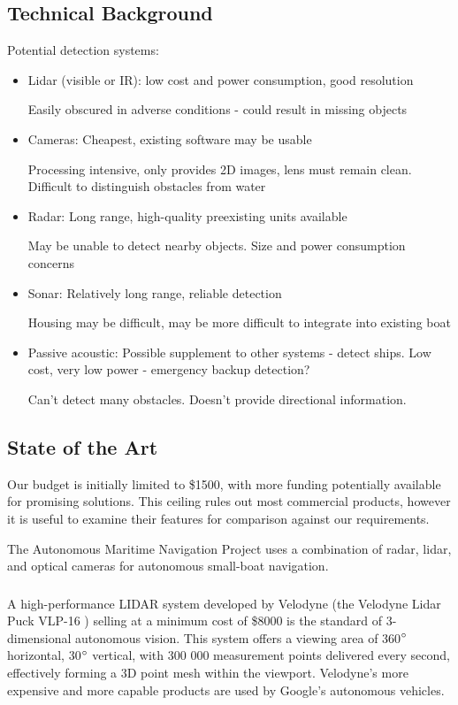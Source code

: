\subsection{\label{sec:intro:technical-background}Technical Background}
Potential detection systems:
\begin{itemize}

\item Lidar (visible or IR): 
low cost and power consumption, good resolution

Easily obscured in adverse conditions - could result in missing objects

\item Cameras: 
Cheapest, existing software may be usable

Processing intensive, only provides 2D images, lens must remain clean.  Difficult to distinguish obstacles from water

\item Radar:
Long range, high-quality preexisting units available

May be unable to detect nearby objects.  Size and power consumption concerns

\item Sonar:
Relatively long range, reliable detection

Housing may be difficult, may be more difficult to integrate into existing boat

\item Passive acoustic:
Possible supplement to other systems - detect ships.  Low cost, very low power - emergency backup detection?

Can't detect many obstacles.  Doesn't provide directional information.
\end{itemize}

\subsection{\label{sec:intro:commercial}State of the Art}
Our budget is initially limited to \$1500, with more funding potentially available for promising solutions. This ceiling rules out most commercial products, however it is useful to examine their features for comparison against our requirements.

The Autonomous Maritime Navigation Project uses a combination of radar, lidar, and optical cameras for autonomous small-boat navigation.

\subsubsection{\label{sec:intro:commercial:lidar}}
A high-performance LIDAR system developed by Velodyne (the Velodyne Lidar Puck VLP-16 \cite{velodyne-vlp16}) selling at a minimum cost of \$8000 is the standard of 3-dimensional autonomous vision. This system offers a viewing area of 360$\degree$ horizontal, 30$\degree$ vertical, with 300 000 measurement points delivered every second, effectively forming a 3D point mesh within the viewport. Velodyne's more expensive and more capable products are used by Google's autonomous vehicles.

